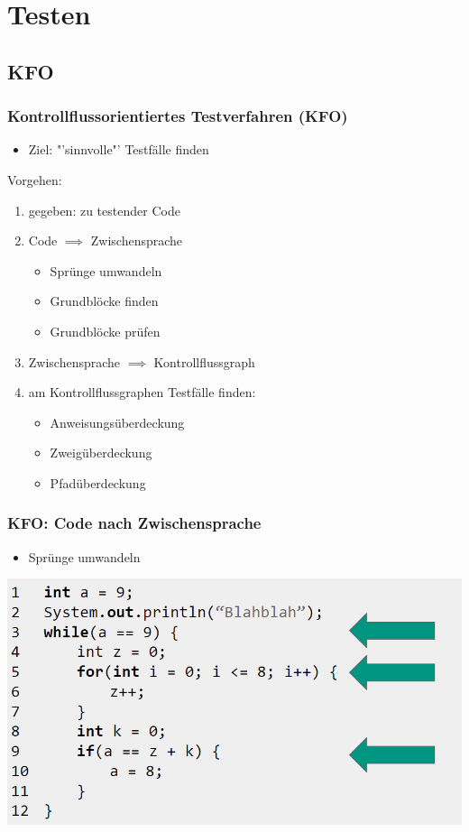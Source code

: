 \documentclass[18pt]{beamer}
\begin{document}
\section{Testen}
	\subsection{KFO}
	\begin{frame}
		\frametitle{Kontrollflussorientiertes Testverfahren (KFO)}
		\begin{itemize}
			\item Ziel: "'sinnvolle"' Testfälle finden
		\end{itemize}
		Vorgehen:
		\begin{enumerate}
			\item gegeben: zu testender Code \pause
			\item Code $\implies$ Zwischensprache
			\begin{itemize}
				\item Sprünge umwandeln
				\item Grundblöcke finden
				\item Grundblöcke prüfen
			\end{itemize}
			\pause
			\item Zwischensprache $\implies$ Kontrollflussgraph \pause
			\item am Kontrollflussgraphen Testfälle finden: \pause
			\begin{itemize}
				\item Anweisungsüberdeckung
				\item Zweigüberdeckung 
				\item Pfadüberdeckung
			\end{itemize}
		\end{enumerate}
	\end{frame}

	\begin{frame}
		\frametitle{KFO: Code nach Zwischensprache}
		\begin{itemize}
			\item Sprünge umwandeln
		\end{itemize}
		\centering \includegraphics[scale=0.34]{./pics/tut5/code.png}
	\end{frame}
\end{document}
